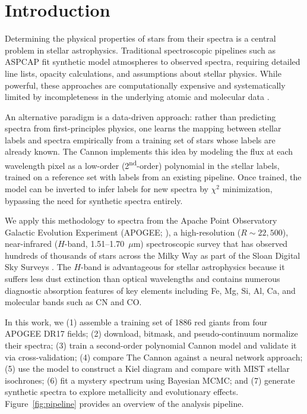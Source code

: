 \documentclass[10pt,preprint2]{aastex}
\begin{document}
\section{Introduction}
\label{sec:intro}

Determining the physical properties of stars from their spectra is a central problem in stellar astrophysics. Traditional spectroscopic pipelines such as ASPCAP \citep{GarciaPerez2016} fit synthetic model atmospheres to observed spectra, requiring detailed line lists, opacity calculations, and assumptions about stellar physics. While powerful, these approaches are computationally expensive and systematically limited by incompleteness in the underlying atomic and molecular data \citep{Holtzman2015}.

An alternative paradigm is a data-driven approach: rather than predicting spectra from first-principles physics, one learns the mapping between stellar labels and spectra empirically from a training set of stars whose labels are already known. The Cannon \citep{Ness2015} implements this idea by modeling the flux at each wavelength pixel as a low-order (2\textsuperscript{nd}-order) polynomial in the stellar labels, trained on a reference set with labels from an existing pipeline. Once trained, the model can be inverted to infer labels for new spectra by $\chi^2$ minimization, bypassing the need for synthetic spectra entirely.

We apply this methodology to spectra from the Apache Point Observatory Galactic Evolution Experiment (APOGEE; \citealt{Majewski2017}), a high-resolution ($R \sim 22{,}500$), near-infrared ($H$-band, 1.51--1.70~$\mu$m) spectroscopic survey that has observed hundreds of thousands of stars across the Milky Way as part of the Sloan Digital Sky Surveys \citep{Abdurrouf2022}. The $H$-band is advantageous for stellar astrophysics because it suffers less dust extinction than optical wavelengths and contains numerous diagnostic absorption features of key elements including Fe, Mg, Si, Al, Ca, and molecular bands such as CN and CO.

In this work, we (1) assemble a training set of 1886 red giants from four APOGEE DR17 fields; (2) download, bitmask, and pseudo-continuum normalize their spectra; (3) train a second-order polynomial Cannon model and validate it via cross-validation; (4) compare The Cannon against a neural network approach; (5) use the model to construct a Kiel diagram and compare with MIST stellar isochrones; (6) fit a mystery spectrum using Bayesian MCMC; and (7) generate synthetic spectra to explore metallicity and evolutionary effects. Figure~\ref{fig:pipeline} provides an overview of the analysis pipeline.
\end{document}
